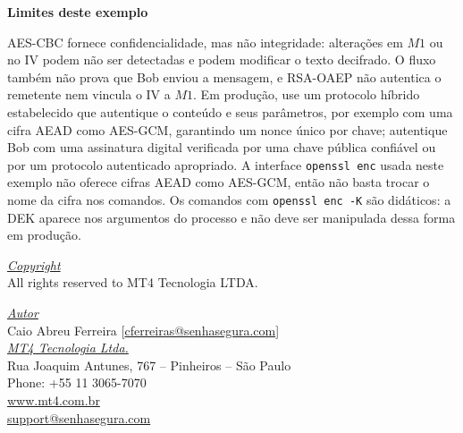 \documentclass{article}
\begin{document}
\textbf{Limites deste exemplo}

AES-CBC fornece confidencialidade, mas não integridade: alterações em \(M1\) ou no IV podem não ser detectadas e podem modificar o texto decifrado. O fluxo também não prova que Bob enviou a mensagem, e RSA-OAEP não autentica o remetente nem vincula o IV a \(M1\). Em produção, use um protocolo híbrido estabelecido que autentique o conteúdo e seus parâmetros, por exemplo com uma cifra AEAD como AES-GCM, garantindo um nonce único por chave; autentique Bob com uma assinatura digital verificada por uma chave pública confiável ou por um protocolo autenticado apropriado. A interface \texttt{openssl enc} usada neste exemplo não oferece cifras AEAD como AES-GCM, então não basta trocar o nome da cifra nos comandos. Os comandos com \texttt{openssl enc -K} são didáticos: a DEK aparece nos argumentos do processo e não deve ser manipulada dessa forma em produção.

\pagebreak

\vspace*{\fill}
\begin{flushright}
	\underline{\textit{Copyright}}\\
	All rights reserved to MT4 Tecnologia LTDA.\bigskip

	\underline{\textit{Autor}}\\
	Caio Abreu Ferreira [\href{mailto:cferreira@senhasegura.com}{cferreiras@senhasegura.com}] \bigskip\\
	
	\underline{\textit{MT4 Tecnologia Ltda.}}\\
	Rua Joaquim Antunes, 767 – Pinheiros – São Paulo\\
	Phone: +55 11 3065-7070\\
	\url{www.mt4.com.br}\\
	\href{mailto:support@senhasegura.com}{support@senhasegura.com}\\
\end{flushright}
\end{document}
